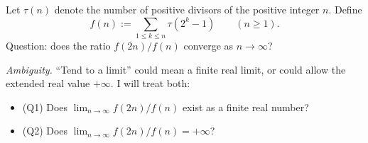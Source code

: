 Let $\tau(n)$ denote the number of positive divisors of the positive integer $n$.
Define
\[
 f(n):=\sum_{1\le k\le n}\tau(2^k-1) \qquad (n\ge 1).
\]
Question: does the ratio $f(2n)/f(n)$ converge as $n\to\infty$?

\emph{Ambiguity.} “Tend to a limit” could mean a finite real limit, or could
allow the extended real value $+\infty$. I will treat both:

\begin{itemize}
\item (Q1) Does $\lim_{n\to\infty} f(2n)/f(n)$ exist as a finite real number?
\item (Q2) Does $\lim_{n\to\infty} f(2n)/f(n)=+\infty$?
\end{itemize}
